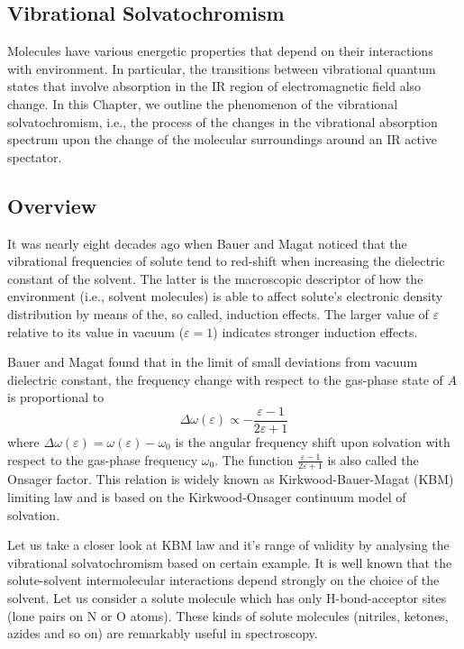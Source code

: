 \documentclass[a4paper,titlepage,twoside,fleqn,12pt]{book}
\begin{document}
\begin{refsection}
\chapter{Vibrational Solvatochromism\label{c:vibr-solv}}

Molecules have various energetic properties that 
depend on their interactions with environment. In particular,
the transitions between vibrational quantum states
that involve absorption in the IR region of 
electromagnetic field also change. 
In this Chapter, we outline the phenomenon 
of the vibrational solvatochromism, i.e., the process of
the changes in the vibrational absorption spectrum upon the change 
of the molecular surroundings around an IR active spectator.

\section{Overview}
%
It was nearly eight decades ago when Bauer and Magat noticed 
that the vibrational frequencies
of solute tend to red-shift when
increasing the dielectric constant of the solvent. \citep{Bauer.Magat.JPhysRadium.1938} 
The latter is the macroscopic descriptor 
of how the environment (i.e., solvent molecules) is able to affect solute's 
electronic density distribution by means of the, so called, induction
effects. The larger value of $\varepsilon$ relative to its value in vacuum
($\varepsilon=1$) indicates stronger induction effects. 

Bauer and Magat found that in the limit of small deviations
from vacuum dielectric constant, the frequency change with respect to the
gas-phase state of $A$ is proportional to
%
\begin{equation} \label{e:kbm}
\Delta \omega(\varepsilon) \propto - \frac{\varepsilon-1}{2\varepsilon+1}
\end{equation}
%
where $\Delta\omega(\varepsilon) = \omega(\varepsilon) - \omega_0$ is the
angular frequency shift upon solvation with respect to the gas-phase frequency
$\omega_0$. The function $\frac{\varepsilon-1}{2\varepsilon+1}$ is also called
the Onsager factor. This relation is widely known as Kirkwood-Bauer-Magat (KBM) 
limiting law and is based on the Kirkwood-Onsager continuum model of 
solvation. \citep{Kirkwood.JCP.1934,Onsager.JACS.1936}

Let us take a closer look at KBM law and it's range of validity by analysing the vibrational
solvatochromism based on certain example. It is well known that 
the solute\hyp{}solvent intermolecular interactions 
depend strongly on the choice of the solvent. \citep{Stone.TheTheoryOfIntermolecularForces.1996,Gutmann.Resch.Linert.CoordChemRev.1982} 
Let us consider a solute molecule which has
only H\hyp{}bond\hyp{}acceptor sites (lone pairs on N or O atoms). These kinds of solute molecules
(nitriles, ketones, azides and so on) are remarkably useful in spectroscopy.


\end{refsection}
\end{document}
